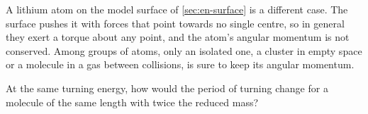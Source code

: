 A lithium atom on the model surface of \cref{sec:en-surface} is a
different case. The surface pushes it with forces that point towards no
single centre, so in general they exert a torque about any point, and the
atom's angular momentum is not conserved. Among groups of atoms, only an isolated
one, a cluster in empty space or a molecule in a gas between collisions,
is sure to keep its angular momentum.


\begin{selfcheck}
At the same turning energy, how would the period of turning change for a
molecule of the same length with twice the reduced mass?
\end{selfcheck}
